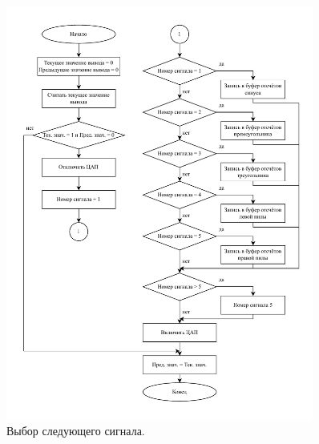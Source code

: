 	\begin{figure}[H]
    \centering
    \includegraphics[width=0.9\textwidth]{../image/plus_signal.pdf}
    \caption{Выбор следующего сигнала.}
	\end{figure}	
	
